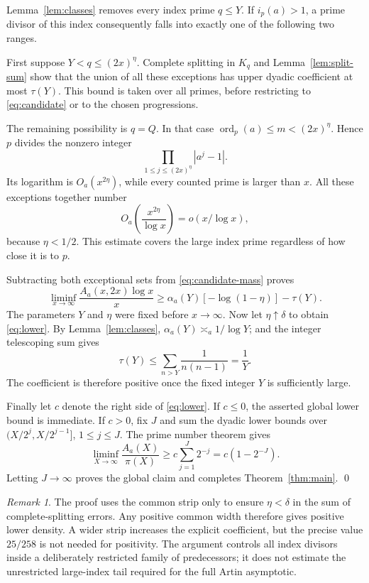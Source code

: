 \documentclass[11pt]{article}
\theoremstyle{remark}
\newtheorem{remark}[theorem]{Remark}
\newcommand{\ord}{\operatorname{ord}}
\newcommand{\1}{\mathbf 1}
\begin{document}
Lemma~\ref{lem:classes} removes every index prime $q\le Y$.
If $i_p(a)>1$, a prime divisor of this index consequently falls
into exactly one of the following two ranges.

First suppose $Y<q\le(2x)^\eta$.  Complete splitting in $K_q$
and Lemma~\ref{lem:split-sum} show that the union of all these
exceptions has upper dyadic coefficient at most $\tau(Y)$.
This bound is taken over all primes, before restricting to
\eqref{eq:candidate} or to the chosen progressions.

The remaining possibility is $q=Q$.  In that case
$\ord_p(a)\le m<(2x)^\eta$.  Hence $p$ divides the nonzero
integer
\[
 \prod_{1\le j\le(2x)^\eta}|a^j-1|.
\]
Its logarithm is $O_a(x^{2\eta})$, while every counted prime
is larger than $x$.  All these exceptions together number
\begin{equation}\label{eq:large-exceptions}
 O_a\!\left(\frac{x^{2\eta}}{\log x}\right)
 =o(x/\log x),
\end{equation}
because $\eta<1/2$.  This estimate covers the large index prime
regardless of how close it is to $p$.

Subtracting both exceptional sets from \eqref{eq:candidate-mass}
proves
\[
 \liminf_{x\to\infty}\frac{A_a(x,2x)\log x}{x}
 \ge\alpha_a(Y)[-\log(1-\eta)]-\tau(Y).
\]
The parameters $Y$ and $\eta$ were fixed before $x\to\infty$.
Now let $\eta\uparrow\delta$ to obtain \eqref{eq:lower}.
By Lemma~\ref{lem:classes}, $\alpha_a(Y)\asymp_a1/\log Y$;
and the integer telescoping sum gives
\[
 \tau(Y)\le\sum_{n>Y}\frac1{n(n-1)}=\frac1Y.
\]
The coefficient is therefore positive once the fixed integer
$Y$ is sufficiently large.

Finally let $c$ denote the right side of \eqref{eq:lower}.
If $c\le0$, the asserted global lower bound is immediate.
If $c>0$, fix $J$ and sum the dyadic lower bounds over
$(X/2^j,X/2^{j-1}]$, $1\le j\le J$.  The prime number theorem
gives
\[
 \liminf_{X\to\infty}\frac{A_a(X)}{\pi(X)}
 \ge c\sum_{j=1}^J2^{-j}=c(1-2^{-J}).
\]
Letting $J\to\infty$ proves the global claim and completes
Theorem~\ref{thm:main}.
\qed

\begin{remark}
The proof uses the common strip only to ensure $\eta<\delta$
in the sum of complete-splitting errors.  Any positive common
width therefore gives positive lower density.  A wider strip
increases the explicit coefficient, but the precise value
$25/258$ is not needed for positivity.  The argument controls
all index divisors inside a deliberately restricted family of
predecessors; it does not estimate the unrestricted large-index
tail required for the full Artin asymptotic.
\end{remark}
\end{document}
